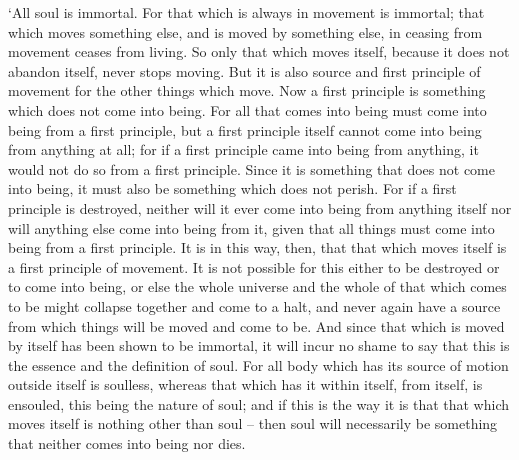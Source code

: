 ‘All soul is immortal. For that which is always in movement is immortal;
that which moves something else, and is moved by something else, in
ceasing from movement ceases from living. So only that which moves
itself, because it does not abandon itself, never stops moving. But it
is also source and first principle  of movement for the other
things which move. Now a first  principle is something which
does not come into being. For all that comes into being must come into
being from a first principle, but a first principle itself cannot come
into being from anything at all; for if a first principle came into
being from anything, it would not do so from a first
principle. Since it is
something that does not come into being, it must also be something which
does not perish. For if a first principle is destroyed, neither will it
 ever come into being from anything itself nor will anything
else come into being from it, given that all things must come into being
from a first principle. It is in this way, then, that that which moves
 itself is a first principle of movement. It is not possible
for this either to be destroyed or to come into being, or else the whole
universe and the whole of that which comes  to be might collapse
together and come to a halt, and never again have a source from which
things will be moved and come to be. And since that which is moved by
itself has been shown to be immortal, it will incur no shame to say that
this is the  essence and the definition of soul. For all body
which has its source of motion outside itself is soulless, whereas that
which has it within itself, from itself, is ensouled, this being the
nature of soul; and if this is the way it is that that which moves
itself is nothing other than soul -- then soul will necessarily be
something that neither comes into being nor dies.

